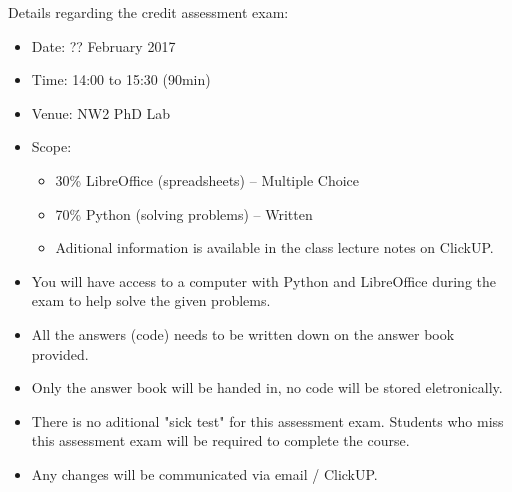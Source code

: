     \noindent
    Details regarding the credit assessment exam:
    \begin{itemize}
        \item Date: ?? February 2017
        \item Time: 14:00 to 15:30 (90min)
        \item Venue: NW2 PhD Lab
        \item Scope:
        \begin{itemize}
            \item 30\% LibreOffice (spreadsheets) -- Multiple Choice
            \item 70\% Python (solving problems) -- Written
            \item Aditional information is available in the class lecture notes
                on ClickUP.
        \end{itemize}
        \item You will have access to a computer with Python and LibreOffice
            during the exam to help solve the given problems.
        \item All the answers (code) needs to be written down on the answer
            book provided.
        \item Only the answer book will be handed in, no code will be
            stored eletronically.
        \item There is no aditional "sick test" for this assessment exam.
            Students who miss this assessment exam will be required to complete
            the course.
        \item Any changes will be communicated via email / ClickUP.
    \end{itemize}
